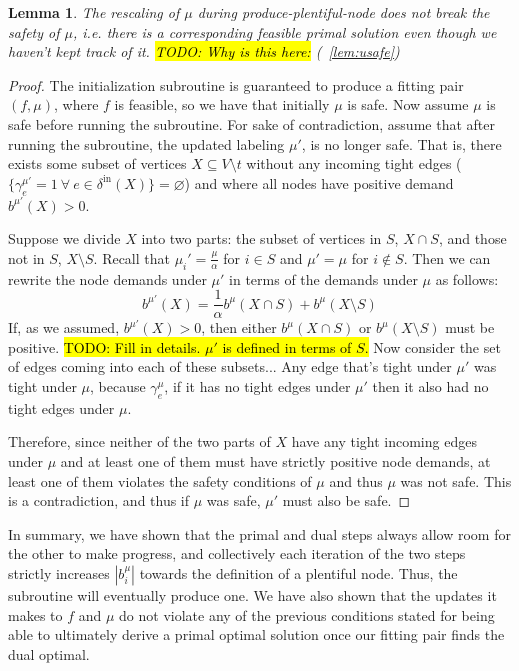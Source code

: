 \documentclass[11pt]{article}
\newtheorem{lemma}[theorem]{Lemma}
\theoremstyle{definition}
\theoremstyle{definition}
\newcommand{\biu}{b_{i}^{\mu}}
\newcommand{\geu}{\gamma_e^{\mu}}
\newcommand{\vnott}{V \setminus t}
\newcommand{\din}{\delta^{\text{in}}}
\newcommand{\fp}{(f,\mu)}
\newcommand{\todo}[1]{\hl{TODO: #1}}
\begin{document}
		\begin{lemma}
			The rescaling of $\mu$ during produce-plentiful-node does not break 
			the safety of $\mu$, i.e. there is a corresponding feasible primal
			solution even though we haven't kept track of it.
			\todo{Why is this here:} (~\ref{lem:usafe})
		\end{lemma}
		\begin{proof}
		The initialization subroutine is guaranteed to produce a fitting pair $\fp$,
		where $f$ is feasible, so we have that initially $\mu$ is safe. Now assume $\mu$
		is safe before running the subroutine. For sake of contradiction, assume that
		after running the subroutine, the updated labeling $\mu'$,
		is no longer safe. That is, there exists some subset of vertices $X \subseteq \vnott$  
		without any incoming tight edges ($\{\gamma_e^{\mu'} = 1\ \forall\ e \in \din(X)\} = \varnothing$)
		and where all nodes have positive demand $b^{\mu'}(X) > 0$.
		
		Suppose we divide $X$ into two parts: the subset of vertices in $S$, $X \cap S$, and those
		not in $S$, $X \setminus S$. Recall that $\mu_i' = \frac{\mu}{\alpha}$ for $i\in S$
		and $\mu' = \mu$ for $i \notin S$. Then we can rewrite the node demands under $\mu'$
		in terms of the demands under $\mu$ as follows:
		$$b^{\mu'}(X) = \frac{1}{\alpha}b^{\mu}(X \cap S) + b^{\mu}(X \setminus S)$$
		If, as we assumed, $b^{\mu'}(X) > 0$, then either $b^{\mu}(X \cap S)$ or 
		$b^{\mu}(X \setminus S)$ must be positive.
		\todo{Fill in details. $\mu'$ is defined in terms of $S$.}
		Now consider the set of edges coming into each of these subsets...
		Any edge that's tight under $\mu'$ was tight under $\mu$, because $\geu$, if
		it has no tight edges under $\mu'$ then it also had no tight edges under
		$\mu$.
		
		Therefore, since neither of the two parts of $X$
		have any tight incoming edges under $\mu$ and at least one of them
		must have strictly positive node demands, at least one of them
		violates the safety conditions of $\mu$ and thus $\mu$ was not safe.
		This is a contradiction, and thus if $\mu$ was safe, $\mu'$ must also be safe.
		
		\end{proof}
		
		In summary, we have shown that the primal and dual steps always allow room for the other to make progress, and collectively each iteration of the two steps strictly increases $|\biu|$ towards
		the definition of a plentiful node. Thus, the subroutine will eventually produce one. We have also shown that the updates it makes to $f$ and $\mu$ do not violate any of the previous conditions stated for being able to ultimately derive a primal optimal solution once our fitting pair finds the dual optimal. 
		
\end{document}
